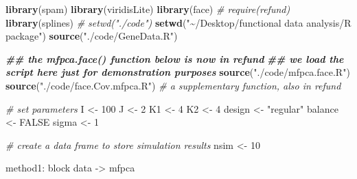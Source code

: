 \documentclass[
]{article}
\newenvironment{Shaded}{\begin{snugshade}}{\end{snugshade}}
\newcommand{\CommentTok}[1]{\textcolor[rgb]{0.56,0.35,0.01}{\textit{#1}}}
\newcommand{\ConstantTok}[1]{\textcolor[rgb]{0.56,0.35,0.01}{#1}}
\newcommand{\DecValTok}[1]{\textcolor[rgb]{0.00,0.00,0.81}{#1}}
\newcommand{\DocumentationTok}[1]{\textcolor[rgb]{0.56,0.35,0.01}{\textbf{\textit{#1}}}}
\newcommand{\FunctionTok}[1]{\textcolor[rgb]{0.13,0.29,0.53}{\textbf{#1}}}
\newcommand{\NormalTok}[1]{#1}
\newcommand{\OtherTok}[1]{\textcolor[rgb]{0.56,0.35,0.01}{#1}}
\newcommand{\StringTok}[1]{\textcolor[rgb]{0.31,0.60,0.02}{#1}}
\begin{document}
\begin{Shaded}
\begin{Highlighting}[]
\FunctionTok{library}\NormalTok{(spam)}
\FunctionTok{library}\NormalTok{(viridisLite)                                                                            }
\FunctionTok{library}\NormalTok{(face)}
\CommentTok{\# require(refund)}
\FunctionTok{library}\NormalTok{(splines)}
\CommentTok{\# setwd("./code")}
\FunctionTok{setwd}\NormalTok{(}\StringTok{"\textasciitilde{}/Desktop/functional data analysis/R package"}\NormalTok{)}
\FunctionTok{source}\NormalTok{(}\StringTok{"./code/GeneData.R"}\NormalTok{)}

\DocumentationTok{\#\# the mfpca.face() function below is now in refund}
\DocumentationTok{\#\# we load the script here just for demonstration purposes}
\FunctionTok{source}\NormalTok{(}\StringTok{"./code/mfpca.face.R"}\NormalTok{)}
\FunctionTok{source}\NormalTok{(}\StringTok{"./code/face.Cov.mfpca.R"}\NormalTok{) }\CommentTok{\# a supplementary function, also in refund}


\CommentTok{\# set parameters}
\NormalTok{I }\OtherTok{\textless{}{-}} \DecValTok{100}
\NormalTok{J }\OtherTok{\textless{}{-}} \DecValTok{2}
\NormalTok{K1 }\OtherTok{\textless{}{-}} \DecValTok{4}
\NormalTok{K2 }\OtherTok{\textless{}{-}} \DecValTok{4}
\NormalTok{design }\OtherTok{\textless{}{-}} \StringTok{"regular"}
\NormalTok{balance }\OtherTok{\textless{}{-}} \ConstantTok{FALSE}
\NormalTok{sigma }\OtherTok{\textless{}{-}} \DecValTok{1}

\CommentTok{\# create a data frame to store simulation results}
\NormalTok{nsim }\OtherTok{\textless{}{-}} \DecValTok{10}
\end{Highlighting}
\end{Shaded}

method1: block data -\textgreater{} mfpca
\end{document}
